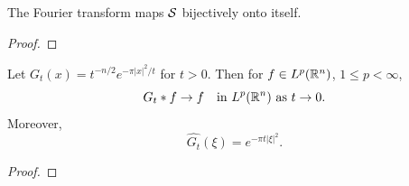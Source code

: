 \begin{proposition}
    The Fourier transform maps $\mathcal{S}$ bijectively onto itself.
\end{proposition}
\begin{proof}
    
\end{proof}

\begin{proposition}
    Let $G_t(x)=t^{-n/2}e^{-\pi |x|^2/t}$ for $t>0$. Then for $f\in L^p(\mathbb{R}^n)$, $1\leq p<\infty$,
    \[
    G_t*f \to f \quad \text{in }L^p(\mathbb{R}^n) \text{ as } t\to 0.
    \]
    Moreover,
    \[
    \widehat{G_t}(\xi)=e^{-\pi t|\xi|^2}.
    \]
\end{proposition}
\begin{proof}
    
\end{proof}



